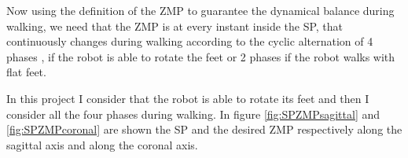 \documentclass[a4paper]{article}
\begin{document}
Now using the definition of the ZMP to guarantee the dynamical balance during walking, we need that the ZMP is at every instant inside the SP, that continuously changes during walking according to the cyclic alternation of 4 phases , if the robot is able to rotate the feet or 2 phases if the robot walks with flat feet.

In this project I consider that the robot is able to rotate its feet and then I consider all the four phases during walking. In figure \ref{fig:SPZMPsagittal} and \ref{fig:SPZMPcoronal} are shown the SP and the desired ZMP respectively along the sagittal axis and along the coronal axis. 
\end{document}
